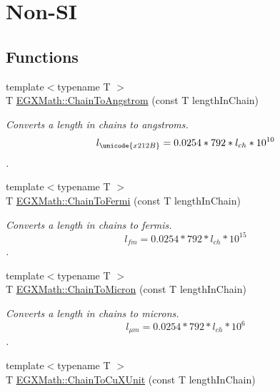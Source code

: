 \hypertarget{group___e_g_x_math-_conversions-_length_conversions-_surveyors-_chain-_non-_s_i}{}\section{Non-\/\+SI}
\label{group___e_g_x_math-_conversions-_length_conversions-_surveyors-_chain-_non-_s_i}
\subsection*{Functions}
\begin{DoxyCompactItemize}
\item 
{\footnotesize template$<$typename T $>$ }\\T \mbox{\hyperlink{group___e_g_x_math-_conversions-_length_conversions-_surveyors-_chain-_non-_s_i_ga89e870762310908510aad80d26dc1942}{E\+G\+X\+Math\+::\+Chain\+To\+Angstrom}} (const T length\+In\+Chain)
\begin{DoxyCompactList}\small\item\em Converts a length in chains to angstroms. \[ l_{\unicode{x212B}}=0.0254 * 792 * l_{ch} * 10^{10} \]. \end{DoxyCompactList}\item 
{\footnotesize template$<$typename T $>$ }\\T \mbox{\hyperlink{group___e_g_x_math-_conversions-_length_conversions-_surveyors-_chain-_non-_s_i_ga88b0e20b062ca36346a6daeb5052c40a}{E\+G\+X\+Math\+::\+Chain\+To\+Fermi}} (const T length\+In\+Chain)
\begin{DoxyCompactList}\small\item\em Converts a length in chains to fermis. \[ l_{fm}=0.0254 * 792 * l_{ch} * 10^{15} \]. \end{DoxyCompactList}\item 
{\footnotesize template$<$typename T $>$ }\\T \mbox{\hyperlink{group___e_g_x_math-_conversions-_length_conversions-_surveyors-_chain-_non-_s_i_ga9efe9ceb0ab30639026cbb4158bb0148}{E\+G\+X\+Math\+::\+Chain\+To\+Micron}} (const T length\+In\+Chain)
\begin{DoxyCompactList}\small\item\em Converts a length in chains to microns. \[ l_{\mu m}=0.0254 * 792 * l_{ch} * 10^{6} \]. \end{DoxyCompactList}\item 
{\footnotesize template$<$typename T $>$ }\\T \mbox{\hyperlink{group___e_g_x_math-_conversions-_length_conversions-_surveyors-_chain-_non-_s_i_ga4d49e29ef32b64b7a433ffe76447cf5f}{E\+G\+X\+Math\+::\+Chain\+To\+Cu\+X\+Unit}} (const T length\+In\+Chain)

\end{DoxyCompactItemize}
